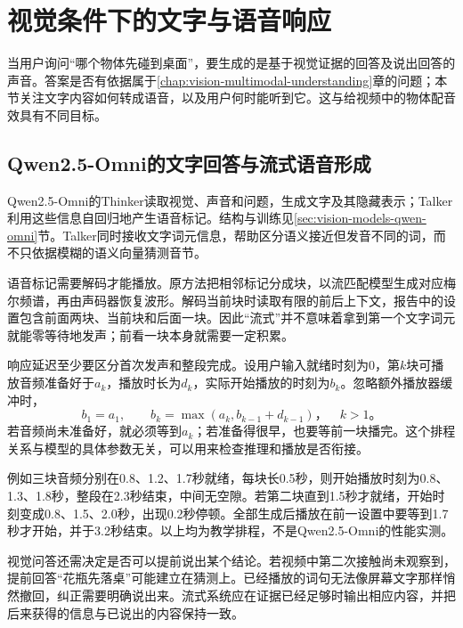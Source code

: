 \section{视觉条件下的文字与语音响应}
\label{sec:vision-multigen-response}

当用户询问“哪个物体先碰到桌面”，要生成的是基于视觉证据的回答及说出回答的声音。答案是否有依据属于\ref{chap:vision-multimodal-understanding}章的问题；本节关注文字内容如何转成语音，以及用户何时能听到它。这与给视频中的物体配音效具有不同目标。

\subsection{Qwen2.5-Omni的文字回答与流式语音形成}
\label{sec:vision-multigen-omni-response}

Qwen2.5-Omni的Thinker读取视觉、声音和问题，生成文字及其隐藏表示；Talker利用这些信息自回归地产生语音标记。结构与训练见\ref{sec:vision-models-qwen-omni}节。Talker同时接收文字词元信息，帮助区分语义接近但发音不同的词，而不只依据模糊的语义向量猜测音节。

语音标记需要解码才能播放。原方法把相邻标记分成块，以流匹配模型生成对应梅尔频谱，再由声码器恢复波形。解码当前块时读取有限的前后上下文，报告中的设置包含前面两块、当前块和后面一块。因此“流式”并不意味着拿到第一个文字词元就能零等待地发声；前看一块本身就需要一定积累。

响应延迟至少要区分首次发声和整段完成。设用户输入就绪时刻为0，第$k$块可播放音频准备好于$a_k$，播放时长为$d_k$，实际开始播放的时刻为$b_k$。忽略额外播放器缓冲时，
\begin{equation}
  b_1=a_1,\qquad
  b_k=\max(a_k,b_{k-1}+d_{k-1})\text{，}\quad k>1\text{。}
  \label{eq:vision-stream-playback}
\end{equation}
若音频尚未准备好，就必须等到$a_k$；若准备得很早，也要等前一块播完。这个排程关系与模型的具体参数无关，可以用来检查推理和播放是否衔接。

例如三块音频分别在0.8、1.2、1.7秒就绪，每块长0.5秒，则开始播放时刻为0.8、1.3、1.8秒，整段在2.3秒结束，中间无空隙。若第二块直到1.5秒才就绪，开始时刻变成0.8、1.5、2.0秒，出现0.2秒停顿。全部生成后播放在前一设置中要等到1.7秒才开始，并于3.2秒结束。以上均为教学排程，不是Qwen2.5-Omni的性能实测。

视觉问答还需决定是否可以提前说出某个结论。若视频中第二次接触尚未观察到，提前回答“花瓶先落桌”可能建立在猜测上。已经播放的词句无法像屏幕文字那样悄然撤回，纠正需要明确说出来。流式系统应在证据已经足够时输出相应内容，并把后来获得的信息与已说出的内容保持一致。

